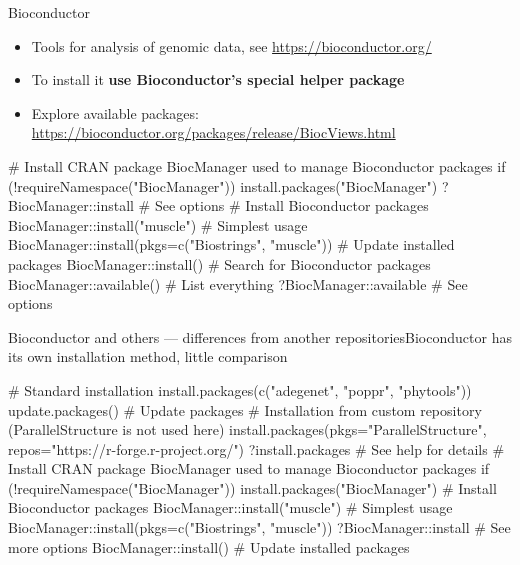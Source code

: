 \documentclass[compress, ucs, xelatex, 11pt, xcolor=svgnames, aspectratio=169,
	hyperref={
		bookmarks=true,
		unicode=true,
		colorlinks=true,
		pdftitle={Molecular data in R},
		plainpages=false,
		pdfauthor={Vojtech Zeisek},
		pdfsubject={Course about phylogeny and evolution in R},
		pdfcreator={XeLaTeX},
		pdfkeywords={R, evolution, phylogeny, molecular data},
		linkcolor=Crimson, %
		anchorcolor=Magenta, %
		citecolor=Magenta, %
		filecolor=Magenta, %
		menucolor=Magenta, %
		urlcolor=DodgerBlue, %
		pdftex},
	url={hyphens, lowtilde} %
	]{beamer}
\begin{document}
\begin{frame}[fragile]{Bioconductor}
	\label{bioc}
	\begin{itemize}
		\item Tools for analysis of genomic data, see \url{https://bioconductor.org/}
		\item To install it \textbf{use Bioconductor's special helper package}
		\item Explore available packages: \href{https://bioconductor.org/packages/}{https://bioconductor.org/packages/release/BiocViews.html}
	\end{itemize}
	\begin{spluscode}
    # Install CRAN package BiocManager used to manage Bioconductor packages
    if (!requireNamespace("BiocManager")) install.packages("BiocManager")
    ?BiocManager::install # See options
    # Install Bioconductor packages
    BiocManager::install("muscle") # Simplest usage
    BiocManager::install(pkgs=c("Biostrings", "muscle"))
    # Update installed packages
    BiocManager::install()
    # Search for Bioconductor packages
    BiocManager::available() # List everything
    ?BiocManager::available # See options
	\end{spluscode}
\end{frame}

\begin{frame}[fragile]{Bioconductor and others --- differences from another repositories}{Bioconductor has its own installation method, little comparison}
	\label{sources-diff}
	\begin{spluscode}
    # Standard installation
    install.packages(c("adegenet", "poppr", "phytools"))
    update.packages() # Update packages
    # Installation from custom repository (ParallelStructure is not used here)
    install.packages(pkgs="ParallelStructure",
      repos="https://r-forge.r-project.org/")
    ?install.packages # See help for details
    # Install CRAN package BiocManager used to manage Bioconductor packages
    if (!requireNamespace("BiocManager")) install.packages("BiocManager")
    # Install Bioconductor packages
    BiocManager::install("muscle") # Simplest usage
    BiocManager::install(pkgs=c("Biostrings", "muscle"))
    ?BiocManager::install # See more options
    BiocManager::install() # Update installed packages
	\end{spluscode}
\end{frame}
\end{document}
